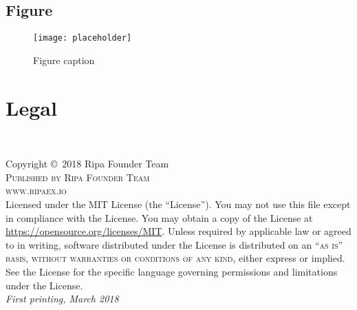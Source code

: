 \documentclass[11pt,fleqn,oneside]{book} %
\begin{document}

\section{Figure}

\begin{figure}[h]
	\centering\texttt{[image: placeholder]}
	\caption{Figure caption}
\end{figure}




\chapter{Legal}



\printbibliography[title={References}]



\newpage
~\vfill
\thispagestyle{empty}

\noindent Copyright \copyright\ 2018 Ripa Founder Team\\ %

\noindent \textsc{Published by Ripa Founder Team}\\ %

\noindent \textsc{www.ripaex.io}\\ %

\noindent Licensed under the MIT License (the ``License''). You may not use this file except in compliance with the License. You may obtain a copy of the License at \url{https://opensource.org/licenses/MIT}. Unless required by applicable law or agreed to in writing, software distributed under the License is distributed on an \textsc{``as is'' basis, without warranties or conditions of any kind}, either express or implied. See the License for the specific language governing permissions and limitations under the License.\\ %

\noindent \textit{First printing, March 2018} %
\end{document}
